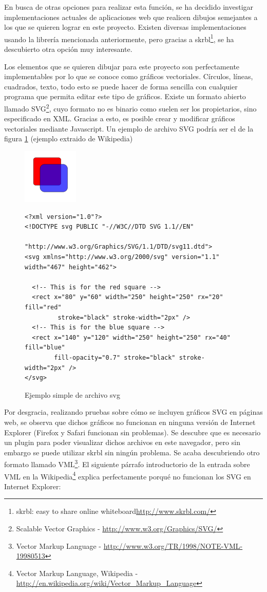 En busca de otras opciones para realizar esta función, se ha decidido investigar implementaciones actuales de aplicaciones web que realicen dibujos semejantes a los que se quieren lograr en este proyecto. Existen diversas implementaciones usando la librería mencionada anteriormente, pero gracias a skrbl\footnote{skrbl: easy to share online whiteboard\url{http://www.skrbl.com/}}, se ha descubierto otra opción muy interesante.

Los elementos que se quieren dibujar para este proyecto son perfectamente implementables por lo que se conoce como gráficos vectoriales. Círculos, líneas, cuadrados, texto, todo esto se puede hacer de forma sencilla con cualquier programa que permita editar este tipo de gráficos. Existe un formato abierto llamado SVG\footnote{Scalable Vector Graphics - \url{http://www.w3.org/Graphics/SVG/}}, cuyo formato no es binario como suelen ser los propietarios, sino especificado en XML. Gracias a esto, es posible crear y modificar gráficos vectoriales mediante Javascript. Un ejemplo de archivo SVG podría ser el de la figura \ref{fig:svg_example} (ejemplo extraido de Wikipedia)

\begin{figure}[ht]
\centering
\includegraphics{svg_example.png}
\begin{verbatim}
<?xml version="1.0"?>
<!DOCTYPE svg PUBLIC "-//W3C//DTD SVG 1.1//EN"
                     "http://www.w3.org/Graphics/SVG/1.1/DTD/svg11.dtd">
<svg xmlns="http://www.w3.org/2000/svg" version="1.1" width="467" height="462">
 
  <!-- This is for the red square -->
  <rect x="80" y="60" width="250" height="250" rx="20" fill="red"
         stroke="black" stroke-width="2px" />
  <!-- This is for the blue square -->
  <rect x="140" y="120" width="250" height="250" rx="40" fill="blue"
        fill-opacity="0.7" stroke="black" stroke-width="2px" />
</svg>
\end{verbatim}
\caption{Ejemplo simple de archivo svg}\label{fig:svg_example}
\end{figure}

Por desgracia, realizando pruebas sobre cómo se incluyen gráficos SVG en páginas web, se observa que dichos gráficos no funcionan en ninguna versión de Internet Explorer (Firefox y Safari funcionan sin problemas). Se descubre que es necesario un plugin para poder visualizar dichos archivos en este navegador, pero sin embargo se puede utilizar skrbl sin ningún problema. Se acaba descubriendo otro formato llamado VML\footnote{Vector Markup Language - \url{http://www.w3.org/TR/1998/NOTE-VML-19980513}}. El siguiente párrafo introductorio de la entrada sobre VML en la Wikipedia\footnote{Vector Markup Language, Wikipedia - \url{http://en.wikipedia.org/wiki/Vector_Markup_Language}} explica perfectamente porqué no funcionan los SVG en Internet Explorer:

